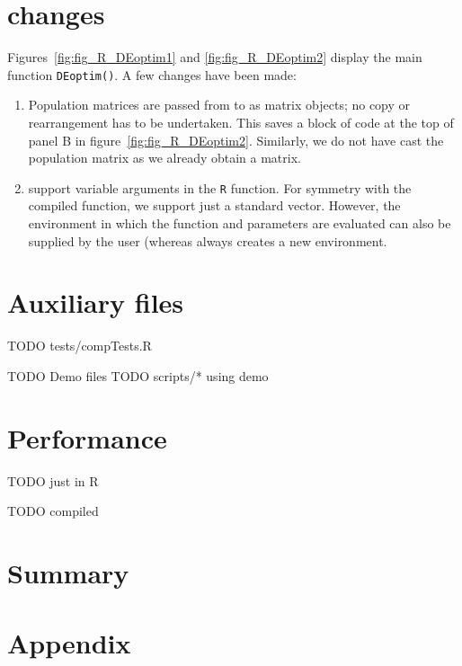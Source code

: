 \documentclass[nojss,shortnames,article]{jss}
\begin{document}
\section[R changes]{ changes}
\label{sec:Rchanges}

Figures~\ref{fig:fig_R_DEoptim1} and \ref{fig:fig_R_DEoptim2}
display the main  function \texttt{DEoptim()}.
A few changes have been made:
\begin{enumerate}
\item Population matrices are passed from  to  as
  matrix objects; no copy or rearrangement has to be undertaken.  This saves
  a block of code at the top of panel B in figure~\ref{fig:fig_R_DEoptim2}.
  Similarly, we do not have cast the population matrix as we already obtain a
  matrix. 
\item {} support variable arguments in the \texttt{R} function.
  For symmetry with the compiled function, we support just a standard
  vector.  However, the environment in which the function and parameters are
  evaluated can also be supplied by the user (whereas  always
  creates a new environment.
\end{enumerate}

\section{Auxiliary files}

TODO tests/compTests.R

TODO Demo files
TODO scripts/* using demo

\section{Performance}

TODO just in R

TODO compiled

\section{Summary}




\section*{Appendix}

\end{document}
